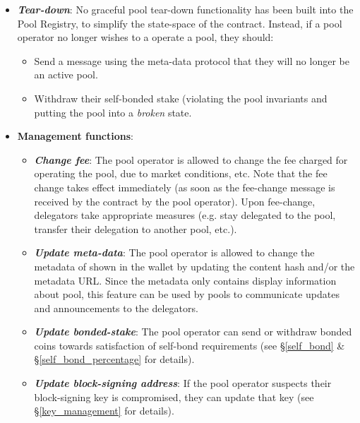 \begin{itemize}
    \item \textbf{\textit{Tear-down}}: No graceful pool tear-down functionality has been built into the Pool Registry, to simplify the state-space of the contract. Instead, if a pool operator no longer wishes to a operate a pool, they should: 
    \begin{itemize}[label=--,nosep]
        \item Send a message using the meta-data protocol that they will no longer be an active pool. 
        \item Withdraw their self-bonded stake (violating the pool invariants and putting the pool into a \textit{broken} state. 
    \end{itemize}
    \item \textbf{Management functions}:
    \begin{itemize}
        \item \textbf{\textit{Change fee}}: The pool operator is allowed to change the fee charged for operating the pool, due to market conditions, etc. Note that the fee change takes effect immediately (as soon as the fee-change message is received by the contract by the pool operator). Upon fee-change, delegators take appropriate measures (e.g. stay delegated to the pool, transfer their delegation to another pool, etc.).
        \item \textbf{\textit{Update meta-data}}: The pool operator is allowed to change the metadata of shown in the wallet by updating the content hash and/or the metadata URL. Since the metadata only contains display information about pool, this feature can be used by pools to communicate updates and announcements to the delegators. 
        \item \textbf{\textit{Update bonded-stake}}: The pool operator can send or withdraw bonded coins towards satisfaction of self-bond requirements (see \S\ref{self_bond} \& \S\ref{self_bond_percentage} for details). 
        \item \textbf{\textit{Update block-signing address}}: If the pool operator suspects their block-signing key is compromised, they can update that  key (see \S\ref{key_management} for details). 
    \end{itemize}
\end{itemize}

